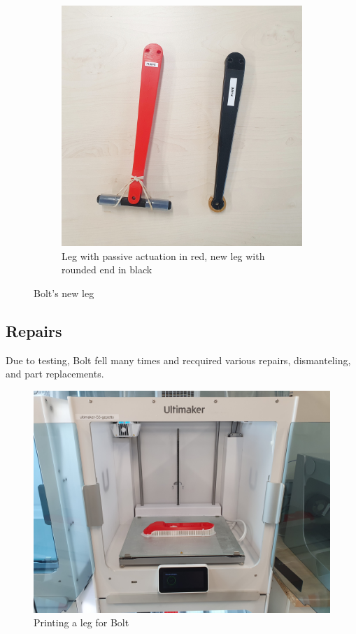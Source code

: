\documentclass[a4paper,10pt]{article}
\begin{document}
\begin{figure}[H]
\begin{subfigure}{.5\textwidth}
  \includegraphics[width=\linewidth, angle=0, scale=0.9]{./images/Bolt_leg.jpg}
  \caption{Leg with passive actuation in red, new leg with rounded end in black}
\end{subfigure}
\caption{Bolt's new leg}
\label{new_bolt_leg}
\end{figure}



\subsection{Repairs}
Due to testing, Bolt fell many times and recquired various repairs, dismanteling, and part replacements. 

\begin{figure}[H]
\centering
  \includegraphics[width=\linewidth, angle=0, scale=0.3]{./images/printing_S5.jpg}
  \caption{Printing a leg for Bolt}
  \label{bolt_printing_S5}
\end{figure}
\end{document}
